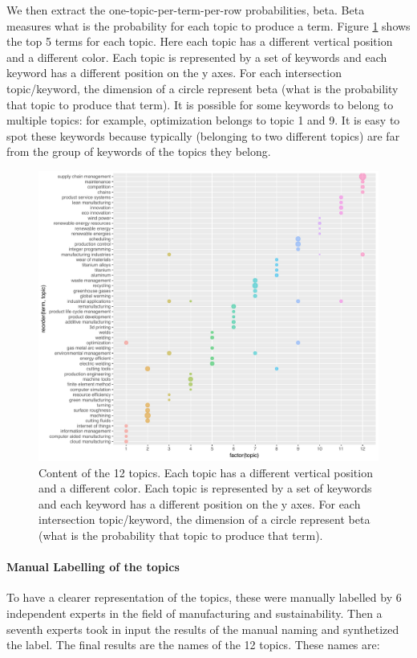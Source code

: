 \documentclass[]{book}
\let\oldparagraph\paragraph
\renewcommand{\paragraph}[1]{\oldparagraph{#1}\mbox{}}
\begin{document}
We then extract the one-topic-per-term-per-row probabilities, beta. Beta
measures what is the probability for each topic to produce a term.
Figure \ref{fig:topicpicture} shows the top 5 terms for each topic. Here
each topic has a different vertical position and a different color. Each
topic is represented by a set of keywords and each keyword has a
different position on the y axes. For each intersection topic/keyword,
the dimension of a circle represent beta (what is the probability that
topic to produce that term). It is possible for some keywords to belong
to multiple topics: for example, optimization belongs to topic 1 and 9.
It is easy to spot these keywords because typically (belonging to two
different topics) are far from the group of keywords of the topics they
belong.

\begin{figure}

{\centering \includegraphics[width=0.6\linewidth]{_bookdown_files/figures/geom_point_topic} 

}

\caption{Content of the 12 topics. Each topic has a different vertical position and a different color. Each topic is represented by a set of keywords and each keyword has a different position on the y axes. For each intersection topic/keyword, the dimension of a circle represent beta (what is the probability that topic to produce that term).}\label{fig:topicpicture}
\end{figure}

\paragraph{Manual Labelling of the
topics}\label{manual-labelling-of-the-topics}

To have a clearer representation of the topics, these were manually
labelled by 6 independent experts in the field of manufacturing and
sustainability. Then a seventh experts took in input the results of the
manual naming and synthetized the label. The final results are the names
of the 12 topics. These names are:
\end{document}
